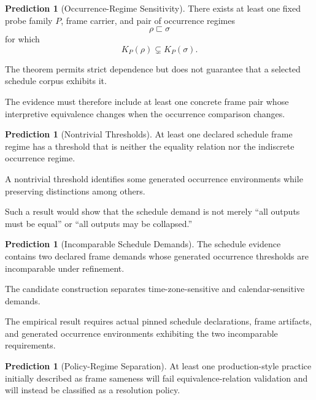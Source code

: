\documentclass[11pt]{article}
\theoremstyle{plain}
\theoremstyle{definition}
\newtheorem{prediction}[theorem]{Prediction}
\theoremstyle{remark}
\begin{document}
\begin{prediction}[Occurrence-Regime Sensitivity]
  \label{ik.prediction.regime-sensitivity}
  There exists at least one fixed probe family \(P\),
  frame carrier,
  and pair of occurrence regimes
  \[
    \rho
    \sqsubset
    \sigma
  \]
  for which
  \[
    K_P(\rho)
    \subsetneq
    K_P(\sigma).
  \]
\end{prediction}

The theorem permits strict dependence
but does not guarantee
that a selected schedule corpus exhibits it.

The evidence must therefore include
at least one concrete frame pair
whose interpretive equivalence changes
when the occurrence comparison changes.

\begin{prediction}[Nontrivial Thresholds]
  \label{ik.prediction.nontrivial-thresholds}
  At least one declared schedule frame regime
  has a threshold
  that is neither
  the equality relation
  nor the indiscrete occurrence regime.
\end{prediction}

A nontrivial threshold identifies
some generated occurrence environments
while preserving distinctions among others.

Such a result would show
that the schedule demand is not merely
``all outputs must be equal''
or
``all outputs may be collapsed.''

\begin{prediction}[Incomparable Schedule Demands]
  \label{ik.prediction.incomparable-demands}
  The schedule evidence contains
  two declared frame demands
  whose generated occurrence thresholds
  are incomparable under refinement.
\end{prediction}

The candidate construction
separates time-zone-sensitive
and calendar-sensitive demands.

The empirical result requires
actual pinned schedule declarations,
frame artifacts,
and generated occurrence environments
exhibiting the two incomparable requirements.

\begin{prediction}[Policy-Regime Separation]
  \label{ik.prediction.policy-regime}
  At least one production-style practice
  initially described as frame sameness
  will fail equivalence-relation validation
  and will instead be classified
  as a resolution policy.
\end{prediction}
\end{document}
